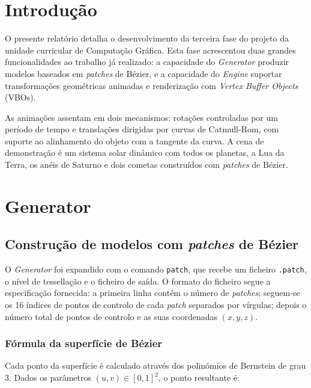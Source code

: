 \documentclass[12pt,a4paper]{article}
\begin{document}
\tableofcontents
\newpage

\section{Introdução}

O presente relatório detalha o desenvolvimento da terceira fase do projeto da unidade curricular de Computação Gráfica. Esta fase acrescentou duas grandes funcionalidades ao trabalho já realizado: a capacidade do \textit{Generator} produzir modelos baseados em \textit{patches} de Bézier, e a capacidade do \textit{Engine} suportar transformações geométricas animadas e renderização com \textit{Vertex Buffer Objects} (VBOs).

As animações assentam em dois mecanismos: rotações controladas por um período de tempo e translações dirigidas por curvas de Catmull-Rom, com suporte ao alinhamento do objeto com a tangente da curva. A cena de demonstração é um sistema solar dinâmico com todos os planetas, a Lua da Terra, os anéis de Saturno e dois cometas construídos com \textit{patches} de Bézier.

\section{Generator}

\subsection{Construção de modelos com \textit{patches} de Bézier}

O \textit{Generator} foi expandido com o comando \texttt{patch}, que recebe um ficheiro \texttt{.patch}, o nível de tessellação e o ficheiro de saída. O formato do ficheiro segue a especificação fornecida: a primeira linha contém o número de \textit{patches}; seguem-se os 16 índices de pontos de controlo de cada \textit{patch} separados por vírgulas; depois o número total de pontos de controlo e as suas coordenadas $(x, y, z)$.

\subsubsection{Fórmula da superfície de Bézier}

Cada ponto da superfície é calculado através dos polinómios de Bernstein de grau 3. Dados os parâmetros $(u, v) \in [0,1]^2$, o ponto resultante é:
\end{document}
